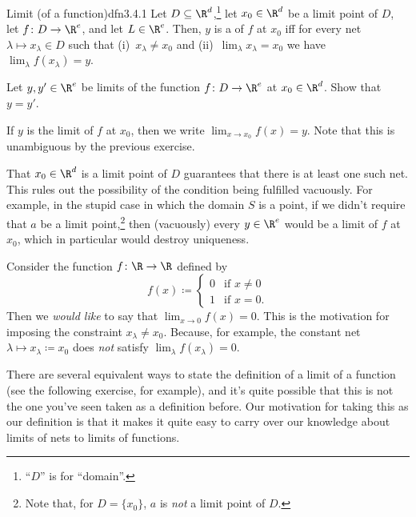 \begin{dfn}{Limit (of a function)}{dfn3.4.1}
Let $D\subseteq \R ^d$,\footnote{``$D$'' is for ``domain''.} let $x_0\in \R ^d$ be a limit point of $D$, let $f\colon D\rightarrow \R ^e$, and let $L\in \R ^e$.  Then, $y$ is a  of $f$ at $x_0$ iff for every net $\lambda \mapsto x_\lambda \in D$ such that (i)~$x_\lambda \neq x_0$ and (ii)~$\lim _\lambda x_\lambda =x_0$ we have $\lim _\lambda f(x_\lambda )=y$.
\begin{exr}{}{}
Let $y,y'\in \R ^e$ be limits of the function $f\colon D\rightarrow \R ^e$ at $x_0\in \R ^d$.  Show that $y=y'$.
\end{exr}
\begin{rmk}
If $y$ is the limit of $f$ at $x_0$, then we write $\lim _{x\to x_0}f(x)=y$.  Note that this is unambiguous by the previous exercise.
\end{rmk}
\begin{rmk}
That $x_0\in \R ^d$ is a limit point of $D$ guarantees that there is at least one such net.  This rules out the possibility of the condition being fulfilled vacuously.  For example, in the stupid case in which the domain $S$ is a point, if we didn't require that $a$ be a limit point,\footnote{Note that, for $D=\{ x_0\}$, $a$ is \emph{not} a limit point of $D$.} then (vacuously) every $y\in \R ^e$ would be a limit of $f$ at $x_0$, which in particular would destroy uniqueness.
\end{rmk}
\begin{rmk}
Consider the function $f\colon \R \rightarrow \R$ defined by
\begin{equation}
f(x)\coloneqq \begin{cases}0 & \text{if }x\neq 0 \\ 1 & \text{if }x=0.\end{cases}
\end{equation}
Then we \emph{would like} to say that $\lim _{x\to 0}f(x)=0$.  This is the motivation for imposing the constraint $x_\lambda \neq x_0$.  Because, for example, the constant net $\lambda \mapsto x_\lambda \coloneqq x_0$ does \emph{not} satisfy $\lim _\lambda f(x_\lambda )=0$.
\end{rmk}
\begin{rmk}
There are several equivalent ways to state the definition of a limit of a function (see the following exercise, for example), and it's quite possible that this is not the one you've seen taken as a definition before.  Our motivation for taking this as our definition is that it makes it quite easy to carry over our knowledge about limits of nets to limits of functions.
\end{rmk}
\end{dfn}
